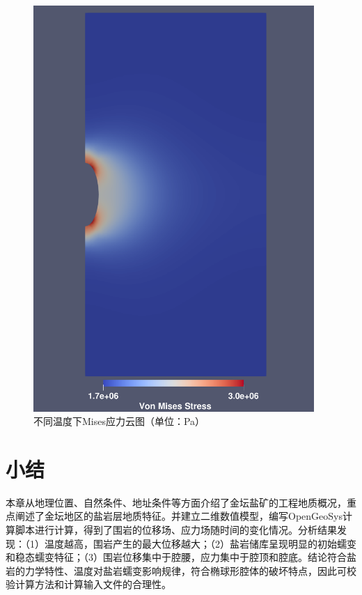 \begin{figure}[ht!]
{\begin{minipage}{7cm}
            \includegraphics[width=0.95\textwidth]{img/chap4/150mises.pdf}
        \end{minipage}
    }
    \caption{不同温度下Mises应力云图（单位：Pa）}
    \label{fig:Mises}
\end{figure}


\section{小结}

本章从地理位置、自然条件、地址条件等方面介绍了金坛盐矿的工程地质概况，重点阐述了金坛地区的盐岩层地质特征。并建立二维数值模型，编写OpenGeoSys计算脚本进行计算，得到了围岩的位移场、应力场随时间的变化情况。分析结果发现：（1）温度越高，围岩产生的最大位移越大；（2）盐岩储库呈现明显的初始蠕变和稳态蠕变特征；（3）围岩位移集中于腔腰，应力集中于腔顶和腔底。结论符合盐岩的力学特性、温度对盐岩蠕变影响规律，符合椭球形腔体的破坏特点，因此可校验计算方法和计算输入文件的合理性。